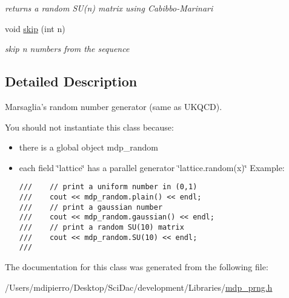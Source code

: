 \begin{CompactItemize}
\begin{CompactList}\small\item\em returns a random SU(n) matrix using Cabibbo-Marinari \item\end{CompactList}\item 
\hypertarget{classmdp__prng_6214a2e9ed4d3da1e61544501e710999}{
void \hyperlink{classmdp__prng_6214a2e9ed4d3da1e61544501e710999}{skip} (int n)}
\label{classmdp__prng_6214a2e9ed4d3da1e61544501e710999}

\begin{CompactList}\small\item\em skip n numbers from the sequence \item\end{CompactList}\end{CompactItemize}


\subsection{Detailed Description}
Marsaglia's random number generator (same as UKQCD). 

You should not instantiate this class because:\begin{itemize}
\item there is a global object mdp\_\-random\item each field \char`\"{}lattice\char`\"{} has a parallel generator \char`\"{}lattice.random(x)\char`\"{} Example: 

\footnotesize\begin{verbatim}
///    // print a uniform number in (0,1)
///    cout << mdp_random.plain() << endl;
///    // print a gaussian number
///    cout << mdp_random.gaussian() << endl;
///    // print a random SU(10) matrix
///    cout << mdp_random.SU(10) << endl;
/// \end{verbatim}
\normalsize
 \end{itemize}


The documentation for this class was generated from the following file:\begin{CompactItemize}
\item 
/Users/mdipierro/Desktop/SciDac/development/Libraries/\hyperlink{mdp__prng_8h}{mdp\_\-prng.h}\end{CompactItemize}
